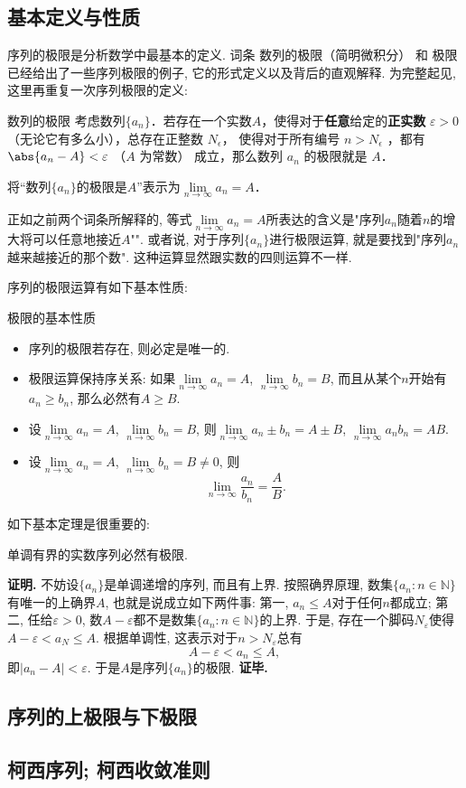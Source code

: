 

\subsection{基本定义与性质}

序列的极限是分析数学中最基本的定义. 词条 数列的极限（简明微积分） 和 极限 已经给出了一些序列极限的例子, 它的形式定义以及背后的直观解释. 为完整起见, 这里再重复一次序列极限的定义:

\begin{definition}{数列的极限}
考虑数列$\{a_n\}$．若存在一个实数$A$，使得对于\textbf{任意}给定的\textbf{正实数} $\varepsilon > 0$（无论它有多么小），总存在正整数 $N_\epsilon$， 使得对于所有编号 $n>N_\epsilon$ ，都有 $\abs{a_n - A} < \varepsilon$ （$A$ 为常数） 成立，那么数列 $a_n$ 的极限就是 $A$．

将“数列$\{a_n\}$的极限是$A$”表示为$\lim\limits_{n\to\infty}a_n=A$．
\end{definition}

正如之前两个词条所解释的, 等式$\lim\limits_{n\to\infty}a_n=A$所表达的含义是"序列$a_n$随着$n$的增大将可以任意地接近$A$"". 或者说, 对于序列$\{a_n\}$进行极限运算, 就是要找到"序列$a_n$越来越接近的那个数". 这种运算显然跟实数的四则运算不一样.

序列的极限运算有如下基本性质:

\begin{theorem}{极限的基本性质}
\begin{itemize}
\item 序列的极限若存在, 则必定是唯一的.
\item 极限运算保持序关系: 如果$\lim\limits_{n\to\infty}a_n=A$, $\lim\limits_{n\to\infty}b_n=B$, 而且从某个$n$开始有$a_n\geq b_n$, 那么必然有$A\geq B$.
\item 设$\lim\limits_{n\to\infty}a_n=A$, $\lim\limits_{n\to\infty}b_n=B$, 则$\lim\limits_{n\to\infty}a_n\pm b_n=A\pm B$, $\lim\limits_{n\to\infty}a_nb_n=AB$.
\item 设$\lim\limits_{n\to\infty}a_n=A$, $\lim\limits_{n\to\infty}b_n=B\neq0$, 则
$$
\lim\limits_{n\to\infty}\frac{a_n}{b_n}=\frac{A}{B}.
$$
\end{itemize}
\end{theorem}

如下基本定理是很重要的:

\begin{theorem}{}
单调有界的实数序列必然有极限.
\end{theorem}
\textbf{证明.} 不妨设$\{a_n\}$是单调递增的序列, 而且有上界. 按照确界原理, 数集$\{a_n:n\in\mathbb{N}\}$有唯一的上确界$A$, 也就是说成立如下两件事: 第一, $a_n\leq A$对于任何$n$都成立; 第二, 任给$\varepsilon>0$, 数$A-\varepsilon$都不是数集$\{a_n:n\in\mathbb{N}\}$的上界. 于是, 存在一个脚码$N_\varepsilon$使得$A-\varepsilon<a_N\leq A$. 根据单调性, 这表示对于$n>N_\varepsilon$总有
\[A-\varepsilon<a_n\leq A,\]
即$|a_n-A|<\varepsilon$. 于是$A$是序列$\{a_n\}$的极限. \textbf{证毕.}

\subsection{序列的上极限与下极限}

\subsection{柯西序列; 柯西收敛准则}